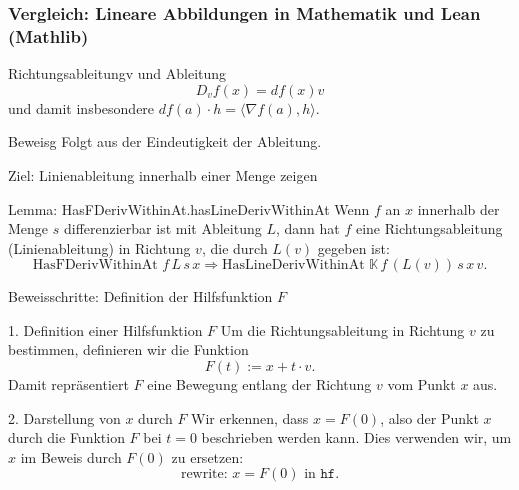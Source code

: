 \documentclass{beamer}
\begin{document}
         
    \begin{frame}
        \frametitle{Vergleich: Lineare Abbildungen in Mathematik und Lean (Mathlib)}
        
        
        \begin{block}{Richtungsableitungv und Ableitung}
            \[
                D_v f (x) = df(x) v
            \]
            und damit insbesondere  $df(a) \cdot h = \langle \nabla f (a) , h \rangle$.
        \end{block}

        \begin{block}{Beweisg}
            Folgt aus der Eindeutigkeit der Ableitung.
        \end{block}
    \end{frame}

    


    \begin{frame}{Ziel: Linienableitung innerhalb einer Menge zeigen}
        \begin{block}{Lemma: HasFDerivWithinAt.hasLineDerivWithinAt}
            Wenn \( f \) an \( x \) innerhalb der Menge \( s \) differenzierbar ist mit Ableitung \( L \), dann hat \( f \) eine Richtungsableitung (Linienableitung) in Richtung \( v \), die durch \( L(v) \) gegeben ist:
            \[
            \text{HasFDerivWithinAt } f \, L \, s \, x \Rightarrow \text{HasLineDerivWithinAt } \mathbb{K} \, f \, (L(v)) \, s \, x \, v.
            \]
        \end{block}
    \end{frame}
    
    \begin{frame}{Beweisschritte: Definition der Hilfsfunktion \( F \)}
        \begin{block}{1. Definition einer Hilfsfunktion \( F \)}
            Um die Richtungsableitung in Richtung \( v \) zu bestimmen, definieren wir die Funktion
            \[
            F(t) := x + t \cdot v.
            \]
            Damit repräsentiert \( F \) eine Bewegung entlang der Richtung \( v \) vom Punkt \( x \) aus.
        \end{block}
    
        \begin{block}{2. Darstellung von \( x \) durch \( F \)}
            Wir erkennen, dass \( x = F(0) \), also der Punkt \( x \) durch die Funktion \( F \) bei \( t = 0 \) beschrieben werden kann. Dies verwenden wir, um \( x \) im Beweis durch \( F(0) \) zu ersetzen:
            \[
            \text{rewrite: } x = F(0) \text{ in } \texttt{hf}.
            \]
        \end{block}
    \end{frame}
    
\end{document}
